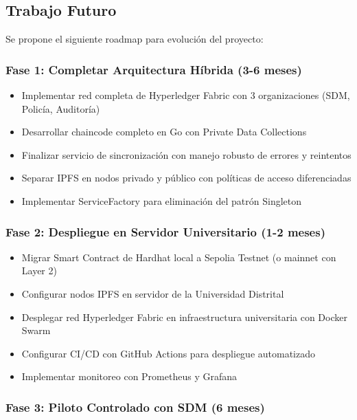 \subsection{Trabajo Futuro}

Se propone el siguiente roadmap para evolución del proyecto:

\subsubsection{Fase 1: Completar Arquitectura Híbrida (3-6 meses)}

\begin{itemize}
    \item Implementar red completa de Hyperledger Fabric con 3 organizaciones (SDM, Policía, Auditoría)
    \item Desarrollar chaincode completo en Go con Private Data Collections
    \item Finalizar servicio de sincronización con manejo robusto de errores y reintentos
    \item Separar IPFS en nodos privado y público con políticas de acceso diferenciadas
    \item Implementar ServiceFactory para eliminación del patrón Singleton
\end{itemize}

\subsubsection{Fase 2: Despliegue en Servidor Universitario (1-2 meses)}

\begin{itemize}
    \item Migrar Smart Contract de Hardhat local a Sepolia Testnet (o mainnet con Layer 2)
    \item Configurar nodos IPFS en servidor de la Universidad Distrital
    \item Desplegar red Hyperledger Fabric en infraestructura universitaria con Docker Swarm
    \item Configurar CI/CD con GitHub Actions para despliegue automatizado
    \item Implementar monitoreo con Prometheus y Grafana
\end{itemize}

\subsubsection{Fase 3: Piloto Controlado con SDM (6 meses)}

